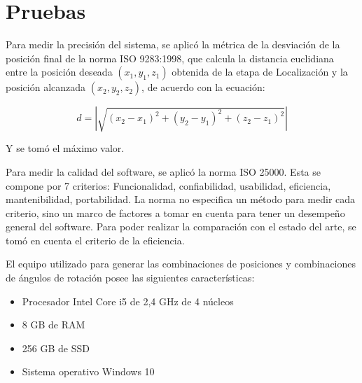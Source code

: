 \section{Pruebas}

Para medir la precisión del sistema, se aplicó la métrica de la desviación de la posición final de la norma ISO 9283:1998, que calcula la distancia euclidiana entre la posición deseada $(x_1, y_1, z_1)$ obtenida de la etapa de Localización y la posición alcanzada $(x_2, y_2, z_2)$, de acuerdo con la ecuación:

\begin{equation}
	d = |\sqrt{(x_2 - x_1)^2 + (y_2 - y_1)^2 + (z_2 - z_1)^2}|
\end{equation}

Y se tomó el máximo valor.

Para medir la calidad del software, se aplicó la norma ISO 25000. Esta se compone por 7 criterios: Funcionalidad, confiabilidad, usabilidad, eficiencia, mantenibilidad, portabilidad. La norma no especifica un método para medir cada criterio, sino un marco de factores a tomar en cuenta para tener un desempeño general del software. Para poder realizar la comparación con el estado del arte, se tomó en cuenta el criterio de la eficiencia.

El equipo utilizado para generar las combinaciones de posiciones y combinaciones de ángulos de rotación posee las siguientes características:

\begin{itemize}
	\item Procesador Intel Core i5 de 2,4 GHz de 4 núcleos
	\item 8 GB de RAM
	\item 256 GB de SSD
	\item Sistema operativo Windows 10
\end{itemize}